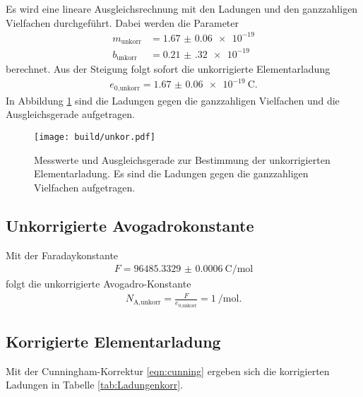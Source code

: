 \FloatBarrier

Es wird eine lineare Ausgleichsrechnung mit den Ladungen und den
ganzzahligen Vielfachen durchgeführt. Dabei werden die Parameter
\begin{align}
  m_\text{unkorr} & = \num{1.67(6)e-19} \\
  b_\text{unkorr} & = \num{0.21(32)e-19}
\end{align}
berechnet. Aus der Steigung folgt sofort die unkorrigierte Elementarladung
\begin{align}
  e_\text{0,unkorr} = \SI{1.67(6)e-19}{\coulomb}.
\end{align}
In Abbildung \ref{fig:elemunkorr} sind die Ladungen gegen die ganzzahligen
Vielfachen und die Ausgleichsgerade aufgetragen.

\begin{figure}
  \centering
  \texttt{[image: build/unkor.pdf]}
  \caption{Messwerte und Ausgleichsgerade zur Bestimmung der unkorrigierten Elementarladung.
  Es sind die Ladungen gegen die ganzzahligen Vielfachen aufgetragen.}
  \label{fig:elemunkorr}
\end{figure}

\FloatBarrier

\subsection{Unkorrigierte Avogadrokonstante}

Mit der Faradaykonstante \cite{Faraday}
\begin{align}
  F = \SI{96485.3329(6)}{\coulomb\per\mol}
\end{align}
folgt die unkorrigierte Avogadro-Konstante
\begin{align}
  N_\text{A,unkorr} = \frac{F}{e_\text{0,unkorr}} = \SI{1}{\per\mol}.
\end{align}

\subsection{Korrigierte Elementarladung}

Mit der Cunningham-Korrektur \eqref{eqn:cunning} ergeben sich die
korrigierten Ladungen in Tabelle \ref{tab:Ladungenkorr}.

